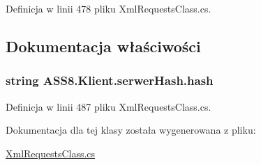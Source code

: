 Definicja w linii 478 pliku XmlRequestsClass.cs.

\subsection{Dokumentacja właściwości}
\hypertarget{a00024_7a7a7837aebfd93a49cc82322210f287}{
\subsubsection[{hash}]{\setlength{\rightskip}{0pt plus 5cm}string ASS8.Klient.serwerHash.hash}}
\label{dc/de2/a00024_7a7a7837aebfd93a49cc82322210f287}




Definicja w linii 487 pliku XmlRequestsClass.cs.

Dokumentacja dla tej klasy została wygenerowana z pliku:\begin{CompactItemize}
\item 
\hyperlink{a00055}{XmlRequestsClass.cs}\end{CompactItemize}

